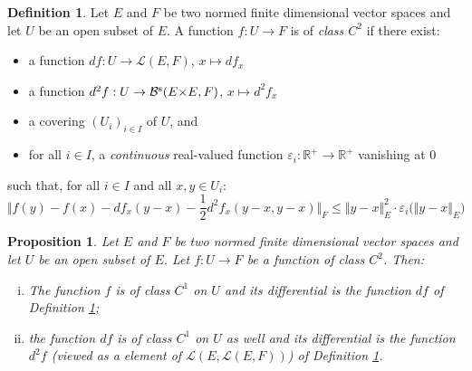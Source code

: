 \documentclass[11pt]{article}
\numberwithin{equation}{section}
\numberwithin{figure}{section}
\renewcommand{\leq}{\leqslant}
\newtheorem{prop}[theo]{Proposition}
\theoremstyle{definition}
\newtheorem{deftn}[theo]{Definition}
\newcommand{\R}{\mathbb R}
\newcommand{\calB}{\mathcal B}
\newcommand{\calL}{\mathcal L}
\newcommand{\symm}{\text{\rm s}}
\begin{document}
\begin{deftn}
\label{def:classC2}
Let $E$ and $F$ be two normed finite dimensional vector spaces and let 
$U$ be an open subset of $E$.
A function $f : U \to F$ is of \emph{class $C^2$} if there exist:
\begin{itemize}
\renewcommand{\itemsep}{0pt}
\item a function $df : U \to \calL(E,F)$, $x \mapsto df_x$
\item a function $d^2 f: U \to \calB^\symm(E{\times}E, F)$, $x \mapsto d^2 f_x$
\item a covering $(U_i)_{i \in I}$ of $U$, and
\item for all $i \in I$, a \emph{continuous} real-valued function 
$\varepsilon_i : \R^+ \to \R^+$ vanishing at $0$
\end{itemize}
such that, for all $i \in I$ and all $x,y \in U_i$:
\begin{equation}
\label{eq:defC2}
\textstyle
\Vert f(y) - f(x) - df_x(y{-}x) - \frac 1 2 d^2 f_x(y{-}x, y{-}x) \Vert_F \leq 
\Vert y{-}x \Vert_E^2 \cdot \varepsilon_i\big(\Vert y{-}x \Vert_E\big)
\end{equation}
\end{deftn}

\begin{prop}
Let $E$ and $F$ be two normed finite dimensional vector spaces and let 
$U$ be an open subset of $E$. Let $f : U \to F$ be a function of class 
$C^2$. Then:
\begin{enumerate}[(i)]
\renewcommand{\itemsep}{0pt}
\item
The function $f$ is of class $C^1$ on $U$ and its differential is the
function $df$ of Definition \ref{def:classC2};
\item
the function $df$ is of class $C^1$ on $U$ as well and its 
differential is the function $d^2 f$ (viewed as a element of $\calL(E, 
\calL(E,F))$) of Definition \ref{def:classC2}.
\end{enumerate}
\end{prop}
\end{document}
